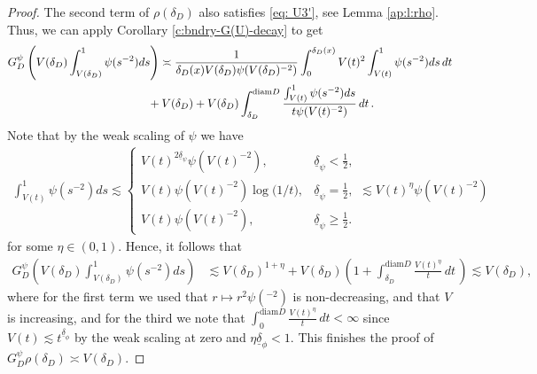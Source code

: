 \documentclass[12pt,a4paper,onecolumn]{article}
\theoremstyle{definition}
\newcommand{\1}{\mathbf 1}
\newcommand{\de}{\delta_D}
\newcommand{\ud}[1]{\underline{\delta}_{#1}}
\newcommand{\GDP}{G_D^\psi}
\newcommand{\diam}{\textrm{diam}}
\numberwithin{equation}{section}
\begin{document}
\begin{proof}
    The second term of $\rho(\de)$ also satisfies \eqref{eq: U3'}, see Lemma \ref{ap:l:rho}.  Thus, we can apply Corollary \ref{c:bndry-G(U)-decay} to get
    \begin{align*}
        \GDP\left(V(\de)\int_{V(\de)}^1\psi(s^{-2})ds\right)&\asymp \frac{1}{\de(x)V(\de)\psi(V(\de)^{-2})}\int_0^{\de(x)}V(t)^2\int_{V(t)}^1\psi(s^{-2})ds\, dt\\
    			&\hspace{-1em}+
    			V(\de)+V(\de)\int_{\de}^{\diam D}
    			\frac{\int_{V(t)}^1\psi(s^{-2})ds}{t\psi(V(t)^{-2})}\, dt\,.  
    \end{align*}
    Note that by the weak scaling of $\psi$ we have
    \begin{align}\label{eq:1802}
        \int_{V(t)}^1\psi(s^{-2})ds\lesssim\begin{cases}
            V(t)^{2\ud{\psi}} \psi(V(t)^{-2}),& \ud{\psi}<\frac12,\\
            V(t)\psi(V(t)^{-2})\log\big(1/t\big),& \ud{\psi}=\frac12,\\
            V(t)\psi(V(t)^{-2}),& \ud{\psi}\ge \frac12.
        \end{cases} \lesssim V(t)^{\eta}\psi(V(t)^{-2})
    \end{align}
    for some $\eta\in (0,1)$. Hence, it follows that
    \begin{align*}
       \GDP\left(V(\de)\int_{V(\de)}^1\psi(s^{-2})ds\right)&\lesssim V(\de)^{1+\eta}+
    			V(\de)\left(1+\int_{\de}^{\diam D}
    			\frac{V(t)^{\eta}}{t}\, dt\,\right)\lesssim V(\de),
    \end{align*}
    where for the first term we used that $r\mapsto r^2\psi(^{-2})$ is non-decreasing, and that $V$ is increasing, and for the third we note that $\int_{0}^{\diam D}\frac{V(t)^{\eta}}{t}\, dt<\infty$ since $V(t)\lesssim t^{\ud{\phi}}$ by the weak scaling at zero and $\eta \ud{\phi}<1$.
    This finishes the proof of $\GDP\rho(\de)\asymp V(\de)$.
    \end{proof}
\end{document}
